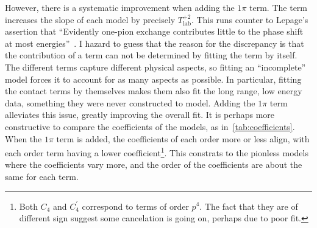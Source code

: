 However, there is a systematic improvement when adding the \(1\pi\) term.
The term increases the slope of each model by precisely
\(T_{\mathrm{lab}}^{+2}\). This runs counter to Lepage's assertion that
``Evidently one-pion exchange contributes little to the phase shift at most
energies''~\cite[p.~36]{lepage1997renormalize}. I hazard to guess that the
reason for the discrepancy is that the contribution of a term can not be determined
by fitting the term by itself. The different terms capture different physical aspects, so fitting an ``incomplete'' model forces it to account for as many
aspects as possible. In particular, fitting the contact terms by themselves
makes them also fit the long range, low energy data, something they were never
constructed to model. Adding the \(1\pi\) term alleviates this issue, greatly
improving the overall fit. It is perhaps more constructive to compare the
coefficients of the models, as in~\cref{tab:coefficients}. When the \(1\pi\)
term is added, the coefficients of each order more or less align, with each
order term having a lower coefficient\footnote{Both \(C_{4}\) and
  \(C_{4}^{\prime}\) correspond to terms of order $p^{4}$. The fact that they are
  of different sign suggest some cancelation is going on, perhaps due to poor
  fit.}. This constrats to the 
pionless models where the coefficients vary more, and the order of the
coefficients are about the same for each term.  



